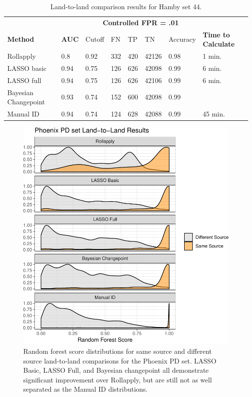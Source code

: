 \documentclass[12pt]{article}
\begin{document}
\begin{table}[]
\centering
\begin{tabular}{llllllll}
& & \multicolumn{5}{c}{\textbf{Controlled FPR = .01}} & \\
\textbf{Method} & \textbf{AUC} & Cutoff & FN &TP & TN & Accuracy & \textbf{Time to Calculate} \\ \hline
Rollapply & 0.8 &  0.92 & 332 & 420&42126 & 0.98 & 1 min.\\ \hline
LASSO basic & 0.94 &  0.75 &126 & 626&42098 & 0.99 & 6 min. \\ \hline
LASSO full & 0.94 &  0.75 &126 &626 &42106 & 0.99 & 6 min. \\ \hline
Bayesian Changepoint & 0.93 &  0.74 &152 & 600&42098 & 0.99 & \\ \hline
Manual ID & 0.94 & 0.74 & 124& 628&42088 & 0.99 & 45 min. \\ \hline 
\end{tabular}
\caption{Land-to-land comparison results for Hamby set 44.}
\label{hamby-table}
\end{table}

\begin{figure}
\centering
\includegraphics{writeup_files/figure-latex/phoenix-groove-results-1.pdf}
\caption{\label{phoenix-groove-results}Random forest score distributions
for same source and different source land-to-land comparisons for the
Phoenix PD set. LASSO Basic, LASSO Full, and Bayesian changepoint all
demonstrate significant improvement over Rollapply, but are still not as
well separated as the Manual ID distributions.}
\end{figure}
\end{document}
